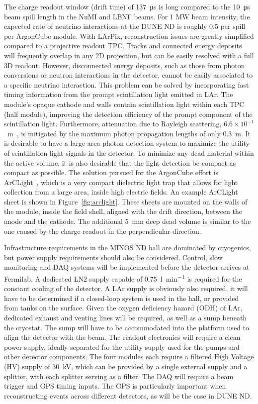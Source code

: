 The charge readout window (drift time) of \SI{137}{\micro\second} is long compared to the \SI{10}{\micro\second}~\cite{numi} beam spill length in the NuMI and LBNF beams.
For 1 MW beam intensity, the expected rate of neutrino interactions at the DUNE ND is roughly 0.5 per spill per ArgonCube module.  
With LArPix, reconstruction issues are greatly simplified compared to a projective readout TPC.
Tracks and connected energy deposits will frequently overlap in any 2D projection, but can be easily resolved with a full 3D readout.
However, disconnected energy deposits, such as those from photon conversions or neutron interactions in the detector, cannot be easily associated to a specific neutrino interaction.
This problem can be solved by incorporating fast timing information from the prompt scintillation light emitted in LAr.
The module's opaque cathode and walls contain scintillation light within each TPC (half module), improving the detection efficiency of the prompt component of the scintillation light. 
Furthermore, attenuation due to Rayleigh scattering, $6.6\times10^{-1}$~m~\cite{Rayleigh}, is mitigated by the maximum photon propagation lengths of only \SI{0.3}{\metre}. 
It is desirable to have a large area photon detection system to maximize the utility of scintillation light signals in the detector. 
To minimize any dead material within the active volume, it is also desirable that the light detection be compact as compact as possible. 
The solution pursued for the ArgonCube effort is ArCLight~\cite{arclight}, which is a very compact dielectric light trap that allows for light collection from a large area, inside high electric fields. 
An example ArCLight sheet is shown in Figure~\ref{fig:arclight}. These sheets are mounted on the walls of the module, inside the field shell, aligned with the drift direction, between the anode and the cathode. 
The additional \SI{5}{\milli\metre} deep dead volume is similar to the one caused by the charge readout in the perpendicular direction.

Infrastructure requirements in the MINOS ND hall are dominated by cryogenics, but power supply requirements should also be considered.
Control, slow monitoring and DAQ systems will be implemented before the detector arrives at Fermilab.  
A dedicated LN2 supply capable of \SI{0.75}{\litre\per\minute} is required for the constant cooling of the detector. 
A LAr supply is obviously also required, it will have to be determined if a closed-loop system is used in the hall, or provided from tanks on the surface.
Given the oxygen deficiency hazard (ODH) of LAr, dedicated exhaust and venting lines will be required, as well as a sump beneath the cryostat.
The sump will have to be accommodated into the platform used to align the detector with the beam.
The readout electronics will require a clean power supply, ideally separated for the utility supply used for the pumps and other detector components.       
The four modules each require a filtered High Voltage (HV) supply of \SI{30}{\kilo\volt}, which can be provided by a single external supply and a splitter, with each splitter serving as a filter.
The DAQ will require a beam trigger and GPS timing inputs. 
The GPS is particularly important when reconstructing events across different detectors, as will be the case in DUNE ND.


